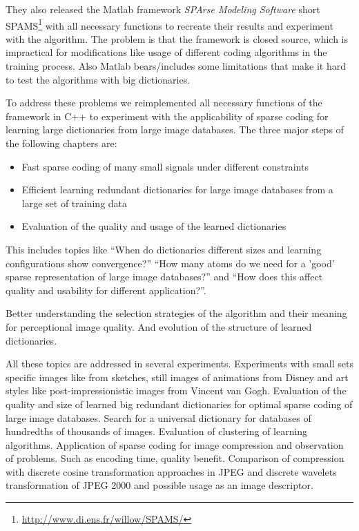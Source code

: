 They also released the Matlab framework \emph{SPArse Modeling Software}
short SPAMS\footnote{\url{http://www.di.ens.fr/willow/SPAMS/}} with all
necessary functions to recreate their results and experiment with the algorithm.
The problem is that the framework is closed source, which is impractical for
modifications like usage of different coding algorithms in the training process.
Also Matlab bears/includes some limitations that make it hard to test the
algorithms with big dictionaries.

To address these problems we reimplemented all necessary functions of the
framework in C++ to experiment with the applicability of sparse coding for
learning large dictionaries from large image databases. The three major steps of
the following chapters are:

\begin{itemize}
 \item Fast sparse coding of many small signals under different constraints
 \item Efficient learning redundant dictionaries for large image databases from
a large set of training data
 \item Evaluation of the quality and usage of the learned dictionaries
\end{itemize}

This includes topics like ``When do dictionaries different sizes and
learning configurations show convergence?'' ``How many atoms do we need  for a
'good' sparse representation of large image databases?''  and ``How does this
affect quality and usability for different application?''. 

Better understanding the selection strategies of the algorithm and their
meaning for perceptional image quality. And evolution of the structure of
learned dictionaries. 

All these topics are addressed in several experiments. Experiments with
small sets specific images like from sketches, still images of animations from
Disney and art styles like post-impressionistic images from Vincent van Gogh.
Evaluation of the quality and size of learned big redundant dictionaries for
optimal sparse coding of large image databases. Search for a universal
dictionary for databases of hundredths of thousands of images. Evaluation of
clustering of learning algorithms. Application of sparse coding for image
compression and observation of problems. Such as encoding time, quality benefit.
Comparison of compression with discrete cosine transformation approaches in JPEG
and discrete wavelets transformation of JPEG 2000 and possible usage as an image
descriptor.







